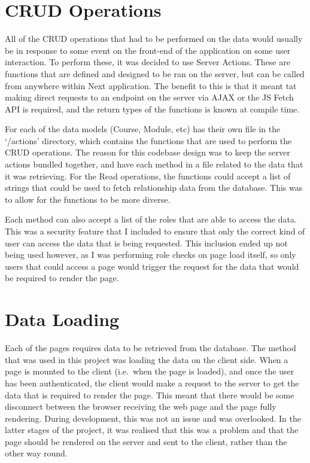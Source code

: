 \documentclass[11pt, a4paper,twoside]{report}
\theoremstyle{plain} %
\theoremstyle{definition} %
\numberwithin{equation}{chapter}
\begin{document}
\section{CRUD Operations}\label{sec:crudoperations}

All of the CRUD operations that had to be performed on the data would usually
be in response to some event on the front-end of the application on some user
interaction. To perform these, it was decided to use Server Actions. These are
functions that are defined and designed to be ran on the server, but can be
called from anywhere within Next application. The benefit to this is that it
meant tat making direct requests to an endpoint on the server via AJAX or the
JS Fetch API is required, and the return types of the functions is known at
compile time.

For each of the data models (Course, Module, etc) has their own file in the
`/actions' directory, which contains the functions that are used to perform the
CRUD operations. The reason for this codebase design was to keep the server
actions bundled together, and have each method in a file related to the data
that it was retrieving. For the Read operations, the functions could accept a
list of strings that could be used to fetch relationship data from the
database. This was to allow for the functions to be more diverse.

Each method can also accept a list of the roles that are able to access the
data. This was a security feature that I included to ensure that only the
correct kind of user can access the data that is being requested. This
inclusion ended up not being used however, as I was performing role checks on
page load itself, so only users that could access a page would trigger the
request for the data that would be required to render the page.

\section{Data Loading}\label{sec:dataloading}

Each of the pages requires data to be retrieved from the database. The method
that was used in this project was loading the data on the client side. When a
page is mounted to the client (i.e.\ when the page is loaded), and once the
user has been authenticated, the client would make a request to the server to
get the data that is required to render the page. This meant that there would
be some disconnect between the browser receiving the web page and the page
fully rendering. During development, this was not an issue and was overlooked.
In the latter stages of the project, it was realised that this was a problem
and that the page should be rendered on the server and sent to the client,
rather than the other way round.
\end{document}
